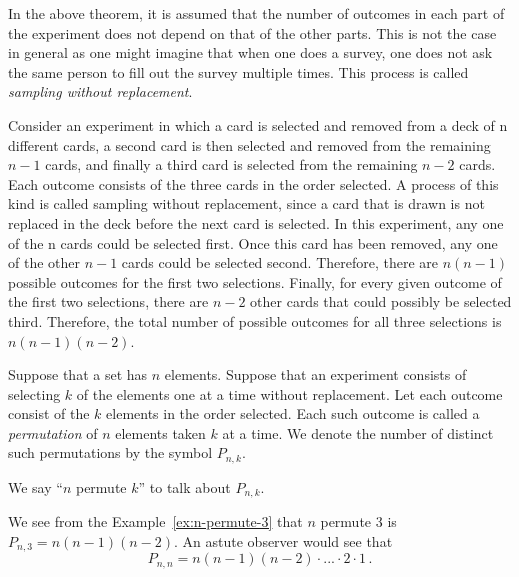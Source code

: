 In the above theorem, it is assumed that the number of outcomes in each part of the experiment 
does not depend on that of the other parts.
This is not the case in general as one might imagine that when one does a survey,
one does not ask the same person to fill out the survey multiple times.
This process is called \emph{sampling without replacement}.

\begin{example}
    \label{ex:n-permute-3}
   Consider an experiment in which a card is selected and removed from a deck of n different cards, a second card is then selected and removed from the remaining $n -1$ cards, and finally a third card is selected from the remaining $n- 2$ cards. Each outcome consists of the three cards in the order selected. A process of this kind is called sampling without replacement, since a card that is drawn is not replaced in the deck before the next card is selected. In this experiment, any one of the n cards could be selected first. Once this card has been removed, any one of the other $n-1$ cards could be selected second. Therefore, there are $n(n-1)$
    possible outcomes for the first two selections. Finally, for every given outcome of the first two selections, there are $n-2$ other cards that could possibly be selected third. Therefore, the total number of possible outcomes for all three selections is $n(n-1)(n-2)$.
\end{example}


\begin{definition}[Permutation]
Suppose that a set has $n$ elements. Suppose that an experiment consists  
of selecting $k$ of the elements one at a time without replacement. 
Let each outcome consist of the $k$ elements in the order selected. 
Each such outcome is called a \emph{permutation} of $n$ elements taken $k$ at a time. 
We denote the number of distinct such
permutations by the symbol $P_{n,k}$.

We say ``$n$ permute $k$'' to talk about $P_{n,k}$.
\end{definition}

\begin{example}
    We see from the Example~\ref{ex:n-permute-3} that $n$ permute $3$ is
    $P_{n,3} = n(n-1)(n-2)$.
    An astute observer would see that
    \begin{equation*}
        P_{n,n} = n(n-1)(n-2)\cdot...\cdot 2\cdot 1  \,.
    \end{equation*}
\end{example}

